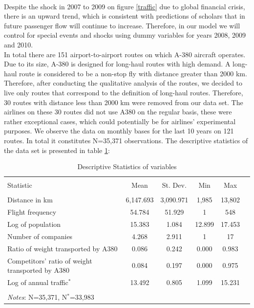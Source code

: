 \documentclass[titlepage, 11pt]{article}
\begin{document}
\\
\tab Despite the shock in 2007 to 2009 on figure \ref{traffic} due to global financial crisis, there is an upward trend, which is consistent with predictions of scholars that in future passenger flow will continue to increase. Therefore, in our model we will control for special events and shocks using dummy variables for years 2008, 2009 and 2010.\\ 
\tab In total there are 151 airport-to-airport routes on which A-380 aircraft operates. Due to its size, A-380 is designed for long-haul routes with high demand. A long-haul route \cite{seatconfig} is considered to be a non-stop fly with distance greater than 2000 km. Therefore, after conducting the qualitative analysis of the routes, we decided to live only routes that correspond to the definition of long-haul routes. Therefore, 30 routes with distance less than 2000 km were removed from our data set. The airlines on these 30 routes did not use A380 on the regular basis, these were rather exceptional cases, which could potentially be for airlines' experimental purposes. We observe the data on monthly bases for the last 10 years on 121 routes. In total it constitutes N=35,371 observations. The descriptive statistics of the data set is presented in table \ref{sumstat}:
\begin{table}[!htbp] \centering 
  \caption{Descriptive Statistics of variables} 
  \label{sumstat} 
  
\begin{tabular}{@{\extracolsep{5pt}}lccccc} 
\\[-1.8ex]\hline 
\hline \\[-1.8ex] 
Statistic &  \multicolumn{1}{c}{Mean} & \multicolumn{1}{c}{St. Dev.} & \multicolumn{1}{c}{Min} & \multicolumn{1}{c}{Max} \\ 
\hline \\[-1.8ex] 
Distance in km & 6,147.693 & 3,090.971 & 1,985 & 13,802 \\ 
Flight frequency & 54.784 & 51.929 & 1 & 548 \\ 
Log of population & 15.383 & 1.084 & 12.899 & 17.453 \\ 
Number of companies  & 4.268 & 2.911 & 1 & 17 \\ 
Ratio of weight transported by A380  & 0.086 & 0.242 & 0.000 & 0.983 \\ 
Competitors' ratio of weight transported by A380 & 0.084 & 0.197 & 0.000 & 0.975 \\ 
Log of annual traffic$^{*}$ & 13.492 & 0.805 & 1.099 & 15.231 \\
\hline \\[-1.8ex] 
{\textit{Notes}: N=35,371, N$^{*}$=33,983}
\end{tabular} 
\end{table}
\end{document}
